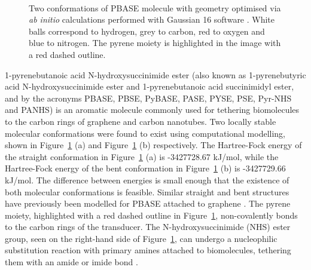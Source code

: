 \documentclass[
  a4paper,
]{scrbook}
\begin{document}
\begin{figure}
\begin{minipage}[t]{0.45\linewidth}
{{}

}

\end{minipage}%
%
\begin{minipage}[t]{0.01\linewidth}

{\centering 

~

}

\end{minipage}%

\caption{\label{fig-pbase-structure}Two conformations of PBASE molecule
with geometry optimised via \emph{ab initio} calculations performed with
Gaussian 16 software \autocite{g16}. White balls correspond to hydrogen,
grey to carbon, red to oxygen and blue to nitrogen. The pyrene moiety is
highlighted in the image with a red dashed outline.}

\end{figure}

1-pyrenebutanoic acid N-hydroxysuccinimide ester (also known as
1-pyrenebutyric acid N-hydroxysuccinimide ester and 1-pyrenebutanoic
acid succinimidyl ester, and by the acronyms PBASE, PBSE, PyBASE, PASE,
PYSE, PSE, Pyr-NHS and PANHS) is an aromatic molecule commonly used for
tethering biomolecules to the carbon rings of graphene and carbon
nanotubes. Two locally stable molecular conformations were found to
exist using computational modelling, shown in
Figure~\ref{fig-pbase-structure} (a) and
Figure~\ref{fig-pbase-structure} (b) respectively. The Hartree-Fock
energy of the straight conformation in Figure~\ref{fig-pbase-structure}
(a) is -3427728.67 kJ/mol, while the Hartree-Fock energy of the bent
conformation in Figure~\ref{fig-pbase-structure} (b) is -3427729.66
kJ/mol. The difference between energies is small enough that the
existence of both molecular conformations is feasible. Similar straight
and bent structures have previously been modelled for PBASE attached to
graphene \autocite{Oishi2022}. The pyrene moiety, highlighted with a red
dashed outline in Figure~\ref{fig-pbase-structure}, non-covalently bonds
to the carbon rings of the transducer. The N-hydroxysuccinimide (NHS)
ester group, seen on the right-hand side of
Figure~\ref{fig-pbase-structure}, can undergo a nucleophilic
substitution reaction with primary amines attached to biomolecules,
tethering them with an amide or imide bond
\autocite{Chen2001,Hermanson2013-16,Hermanson2013-3,Shkodra2021,Mishyn2022}.
\end{document}
